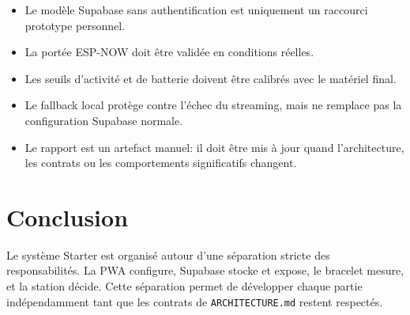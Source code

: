 \documentclass[11pt,a4paper]{article}
\begin{document}
\begin{itemize}
  \item Le modèle Supabase sans authentification est uniquement un raccourci prototype personnel.
  \item La portée ESP-NOW doit être validée en conditions réelles.
  \item Les seuils d'activité et de batterie doivent être calibrés avec le matériel final.
  \item Le fallback local protège contre l'échec du streaming, mais ne remplace pas la configuration Supabase normale.
  \item Le rapport est un artefact manuel: il doit être mis à jour quand l'architecture, les contrats ou les comportements significatifs changent.
\end{itemize}

\section{Conclusion}

Le système Starter est organisé autour d'une séparation stricte des responsabilités. La PWA configure, Supabase stocke et expose, le bracelet mesure, et la station décide. Cette séparation permet de développer chaque partie indépendamment tant que les contrats de \texttt{ARCHITECTURE.md} restent respectés.
\end{document}

